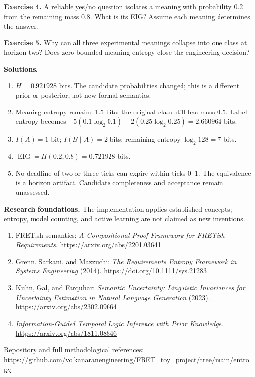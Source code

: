 \documentclass[11pt,a4paper]{article}
\begin{document}
\textbf{Exercise 4.} A reliable yes/no question isolates a meaning with probability 0.2 from the remaining mass 0.8. What is its EIG? Assume each meaning determines the answer.

\textbf{Exercise 5.} Why can all three experimental meanings collapse into one class at horizon two? Does zero bounded meaning entropy close the engineering decision?

\textbf{Solutions.}
\begin{enumerate}
\item \(H=0.921928\) bits. The candidate probabilities changed; this is a different prior or posterior, not new formal semantics.
\item Meaning entropy remains 1.5 bits: the original class still has mass 0.5. Label entropy becomes \(-5(0.1\log_2 0.1)-2(0.25\log_2 0.25)=2.660964\) bits.
\item \(I(A)=1\) bit; \(I(B\mid A)=2\) bits; remaining entropy \(\log_2 128=7\) bits.
\item \(\operatorname{EIG}=H(0.2,0.8)=0.721928\) bits.
\item No deadline of two or three ticks can expire within ticks 0--1. The equivalence is a horizon artifact. Candidate completeness and acceptance remain unassessed.
\end{enumerate}

\textbf{Research foundations.} The implementation applies established concepts; entropy, model counting, and active learning are not claimed as new inventions.
\begin{enumerate}
\item FRETish semantics: \emph{A Compositional Proof Framework for FRETish Requirements}. \url{https://arxiv.org/abs/2201.03641}
\item Grenn, Sarkani, and Mazzuchi: \emph{The Requirements Entropy Framework in Systems Engineering} (2014). \url{https://doi.org/10.1111/sys.21283}
\item Kuhn, Gal, and Farquhar: \emph{Semantic Uncertainty: Linguistic Invariances for Uncertainty Estimation in Natural Language Generation} (2023). \url{https://arxiv.org/abs/2302.09664}
\item \emph{Information-Guided Temporal Logic Inference with Prior Knowledge}. \url{https://arxiv.org/abs/1811.08846}
\end{enumerate}
\small Repository and full methodological references:\\
\url{https://github.com/volkanaranengineering/FRET_toy_project/tree/main/entropy}
\end{document}
